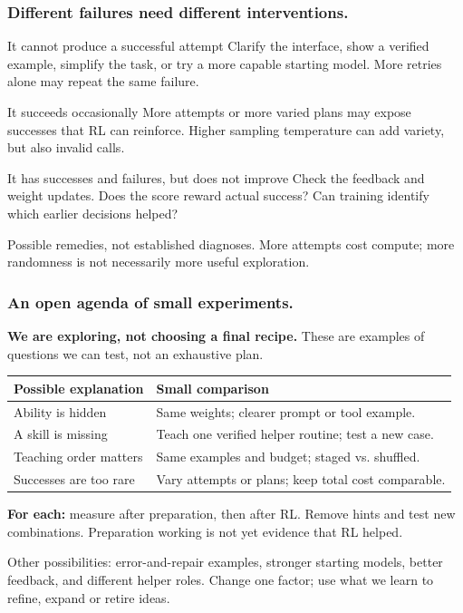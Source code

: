 \documentclass[aspectratio=169,11pt]{beamer}
\newcommand{\aside}[1]{\vfill{\footnotesize\color{Gray}#1\par}}
\begin{document}
\begin{frame}[t]
\frametitle{Different failures need different interventions.}
\begin{block}{It cannot produce a successful attempt}
Clarify the interface, show a verified example, simplify the task, or try a more capable starting model. More retries alone may repeat the same failure.
\end{block}
\begin{block}{It succeeds occasionally}
More attempts or more varied plans may expose successes that RL can reinforce. Higher sampling temperature can add variety, but also invalid calls.
\end{block}
\begin{block}{It has successes and failures, but does not improve}
Check the feedback and weight updates. Does the score reward actual success? Can training identify which earlier decisions helped?
\end{block}
\aside{Possible remedies, not established diagnoses. More attempts cost compute; more randomness is not necessarily more useful exploration.}
\end{frame}

\begin{frame}[t]
\frametitle{An open agenda of small experiments.}
\textbf{We are exploring, not choosing a final recipe.} These are examples of questions we can test, not an exhaustive plan.
\medskip
\begin{center}
\renewcommand{\arraystretch}{1.2}
\begin{tabular}{p{}p{}}
\toprule
Possible explanation & Small comparison \\
\midrule
Ability is hidden & Same weights; clearer prompt or tool example. \\
A skill is missing & Teach one verified helper routine; test a new case. \\
Teaching order matters & Same examples and budget; staged vs. shuffled. \\
Successes are too rare & Vary attempts or plans; keep total cost comparable. \\
\bottomrule
\end{tabular}
\end{center}
\medskip
\textbf{For each:} measure after preparation, then after RL. Remove hints and test new combinations. Preparation working is not yet evidence that RL helped.
\aside{Other possibilities: error-and-repair examples, stronger starting models, better feedback, and different helper roles. Change one factor; use what we learn to refine, expand or retire ideas.}
\end{frame}
\end{document}
